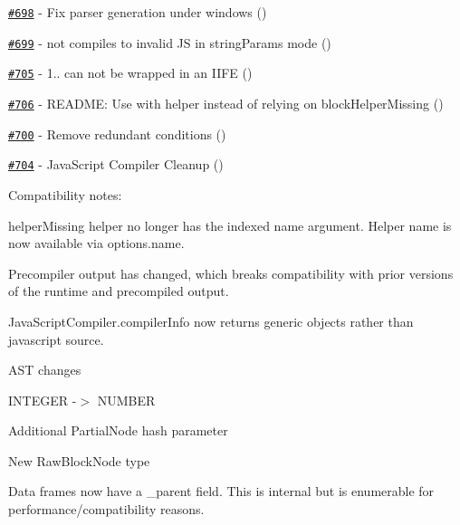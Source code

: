 \begin{DoxyItemize}
\item \href{https://github.com/wycats/handlebars.js/pull/698}{\tt \#698} -\/ Fix parser generation under windows (\href{https://api.github.com/users/osiris43}{\tt })
\item \href{https://github.com/wycats/handlebars.js/issues/699}{\tt \#699} -\/  not compiles to invalid JS in string\+Params mode (\href{https://api.github.com/users/kpdecker}{\tt })
\item \href{https://github.com/wycats/handlebars.js/issues/705}{\tt \#705} -\/ 1.. can not be wrapped in an I\+I\+FE (\href{https://api.github.com/users/craigteegarden}{\tt })
\item \href{https://github.com/wycats/handlebars.js/pull/706}{\tt \#706} -\/ R\+E\+A\+D\+ME\+: Use with helper instead of relying on block\+Helper\+Missing (\href{https://api.github.com/users/scottgonzalez}{\tt })
\item \href{https://github.com/wycats/handlebars.js/pull/700}{\tt \#700} -\/ Remove redundant conditions (\href{https://api.github.com/users/blakeembrey}{\tt })
\item \href{https://github.com/wycats/handlebars.js/pull/704}{\tt \#704} -\/ Java\+Script Compiler Cleanup (\href{https://api.github.com/users/blakeembrey}{\tt })
\end{DoxyItemize}

Compatibility notes\+:
\begin{DoxyItemize}
\item {\ttfamily helper\+Missing} helper no longer has the indexed name argument. Helper name is now available via {\ttfamily options.\+name}.
\item Precompiler output has changed, which breaks compatibility with prior versions of the runtime and precompiled output.
\item {\ttfamily Java\+Script\+Compiler.\+compiler\+Info} now returns generic objects rather than javascript source.
\item A\+ST changes
\begin{DoxyItemize}
\item I\+N\+T\+E\+G\+ER -\/$>$ N\+U\+M\+B\+ER
\item Additional Partial\+Node hash parameter
\item New Raw\+Block\+Node type
\end{DoxyItemize}
\item Data frames now have a {\ttfamily \+\_\+parent} field. This is internal but is enumerable for performance/compatibility reasons.
\end{DoxyItemize}

